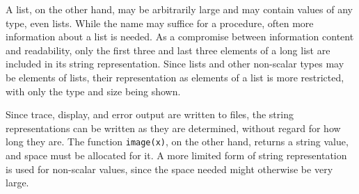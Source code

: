 A list, on the other hand, may be arbitrarily large and may contain
values of any type, even lists. While the name may suffice for a
procedure, often more information about a list is needed. As a
compromise between information content and readability, only the first
three and last three elements of a long list are included in its
string representation.  Since lists and other non-scalar types may be
elements of lists, their representation as elements of a list is more
restricted, with only the type and size being shown.

Since trace, display, and error output are written to files, the
string representations can be written as they are determined, without
regard for how long they are. The function \texttt{image(x)}, on the
other hand, returns a string value, and space must be allocated for
it. A more limited form of string representation is used for
non-scalar values, since the space needed might otherwise be very
large.

